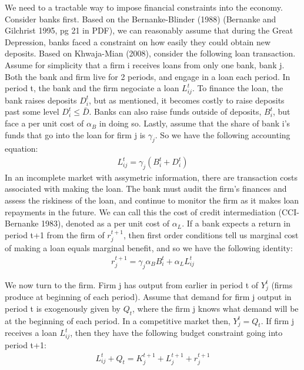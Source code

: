 \documentclass[letter,11pt]{article}
\begin{document}
{We need to a tractable way to impose financial constraints into the economy. Consider banks first. Based on the Bernanke-Blinder (1988) (Bernanke and Gilchrist 1995, pg 21 in PDF), we can reasonably assume that during the Great Depression, banks faced a constraint on how easily they could obtain new deposits. Based on Khwaja-Mian (2008), consider the following loan transaction. Assume for simplicity that a firm i receives loans from only one bank, bank j. Both the bank and firm live for 2 periods, and engage in a loan each period. In period t, the bank and the firm negociate a loan $L_{ij}^t$. To finance the loan, the bank raises deposits $D_i^t$, but as mentioned, it becomes costly to raise deposits past some level $D_i^t \leq \bar{D}$. Banks can also raise funds outside of deposits, $B_i^t$, but face a per unit cost of $\alpha_B$ in doing so. Lastly, assume that the share of bank i's funds that go into the loan for firm j is $\gamma_j$. So we have the following accounting equation:
\begin{align*}
L_{ij}^t = \gamma_j (B_i^t + D_i^t)
\end{align*}
In an incomplete market with assymetric information, there are transaction costs associated with making the loan. The bank must audit the firm's finances and assess the riskiness of the loan, and continue to monitor the firm as it makes loan repayments in the future. We can call this the cost of credit intermediation (CCI-Bernanke 1983), denoted as a per unit cost of $\alpha_L$. If a bank expects a return in period t+1 from the firm of $r_j^{t+1}$, then first order conditions tell us marginal cost of making a loan equals marginal benefit, and so we have the following identity:
\begin{align*}
r_j^{t+1} = \gamma_j \alpha_B B_i^t + \alpha_L L_{ij}^t
\end{align*}

We now turn to the firm. \iffalse The firm has two sources of funding -- loans from bank j, $L_{ij}^t$, and external financing, $E_{ij}^t$. External financing requires connections with other investors, and higher levels of collateral. So suppose only large firms are able to find external financing, and then access to external financing by firm j is given by $\mathds{1}_{Large firm} E_{ij}^t$. \fi Firm j has output from earlier in period t of $Y_j^t$ (firms produce at beginning of each period). Assume that demand for firm j output in period t is exogenously given by $Q_t$, where the firm j knows what demand will be at the beginning of each period. In a competitive market then, $Y_j^t = Q_t$. If firm j receives a loan $L_{ij}^t$, then they have the following budget constraint going into period t+1:
\begin{align*}
L_{ij}^t + \iffalse \mathds{1}_{Large firm} E_{ij}^t +\fi Q_t = K_j^{t+1} + L_j^{t+1} + r_j^{t+1}
\end{align*}



}
\end{document}
